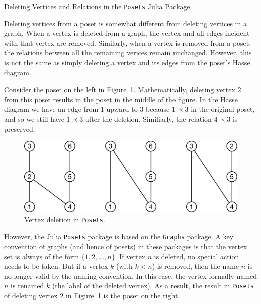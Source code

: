 \documentclass[12pt]{article}
\begin{document}
\begin{center}
  \large
  Deleting Vertices and Relations in the \texttt{Posets} Julia Package
\end{center}


Deleting vertices from a poset is somewhat different from deleting
vertices in a graph. When a vertex is deleted from a graph, the vertex
and all edges incident with that vertex are removed. Similarly, when
a vertex is removed from a poset, the relations between all the
remaining verices remain unchanged. However, this is not the same as
simply deleting a vertex and its edges from the poset's Hasse
diagram. 

Consider the poset on the left in Figure~\ref{fig:vertex-deletion}. 
Mathematically, deleting vertex $2$ from this poset results in the
poset in the middle of the figure. In the Hasse diagram we have an
edge from 1 upward to 3 because $1\prec 3$ in the original poset, and
so we still have $1 \prec 3$ after the deletion. Similiarly, the
relation $4\prec3$ is preserved.

\begin{figure}[h]
\begin{framed}
  \begin{center}
    \includegraphics[scale=0.4]{vertex-deletion}
  \end{center}
  \caption{Vertex deletion in \texttt{Posets}.}
  \label{fig:vertex-deletion}
\end{framed}
\end{figure}

However, the Julia \texttt{Posets} package is based on the
\texttt{Graphs} package. A key convention of graphs (and hence of
posets) in these packages is that the vertex set is always of the form
$\{1,2,\ldots,n\}$. If vertex $n$ is deleted, no special action needs
to be taken. But if a vertex $k$ (with $k<n$) is removed, then the
name $n$ is no longer valid by the naming convention. In this case,
the vertex formally named $n$ is renamed $k$ (the label of the deleted
vertex). As a result, the result in \texttt{Posets} of deleting vertex
$2$ in Figure~\ref{fig:vertex-deletion} is the poset on the right.
\end{document}
